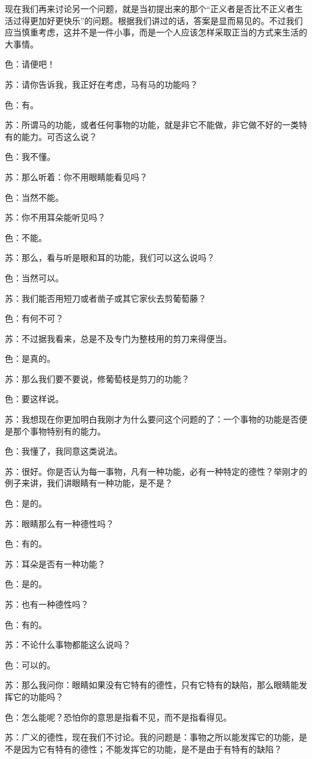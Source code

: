 \documentclass[11pt,oneside]{book}
\begin{document}
\begin{common-format}
现在我们再来讨论另一个问题，就是当初提出来的那个“正义者是否比不正义者生活过得更加好更快乐”的问题。根据我们讲过的话，答案是显而易见的。不过我们应当慎重考虑，这并不是一件小事，而是一个人应该怎样采取正当的方式来生活的大事情。

色：请便吧！

苏：请你告诉我，我正好在考虑，马有马的功能吗？

色：有。

苏：所谓马的功能，或者任何事物的功能，就是非它不能做，非它做不好的一类特有的能力。可否这么说？

色：我不懂。

苏：那么听着：你不用眼睛能看见吗？

色：当然不能。

苏：你不用耳朵能听见吗？

色：不能。

苏：那么，看与听是眼和耳的功能，我们可以这么说吗？

色：当然可以。

苏：我们能否用短刀或者凿子或其它家伙去剪葡萄藤？

色：有何不可？

苏：不过据我看来，总是不及专门为整枝用的剪刀来得便当。

色：是真的。

苏：那么我们要不要说，修葡萄枝是剪刀的功能？

色：要这样说。

苏：我想现在你更加明白我刚才为什么要问这个问题的了：一个事物的功能是否便是那个事物特别有的能力。

色：我懂了，我同意这类说法。

苏：很好。你是否认为每一事物，凡有一种功能，必有一种特定的德性？举刚才的例子来讲，我们讲眼睛有一种功能，是不是？

色：是的。

苏：眼睛那么有一种德性吗？

色：有的。

苏：耳朵是否有一种功能？

色：是的。

苏：也有一种德性吗？

色：有的。

苏：不论什么事物都能这么说吗？

色：可以的。

苏：那么我问你：眼睛如果没有它特有的德性，只有它特有的缺陷，那么眼睛能发挥它的功能吗？

色：怎么能呢？恐怕你的意思是指看不见，而不是指看得见。

苏：广义的德性，现在我们不讨论。我的问题是：事物之所以能发挥它的功能，是不是因为它有特有的德性；不能发挥它的功能，是不是由于有特有的缺陷？


\end{common-format}
\end{document}
